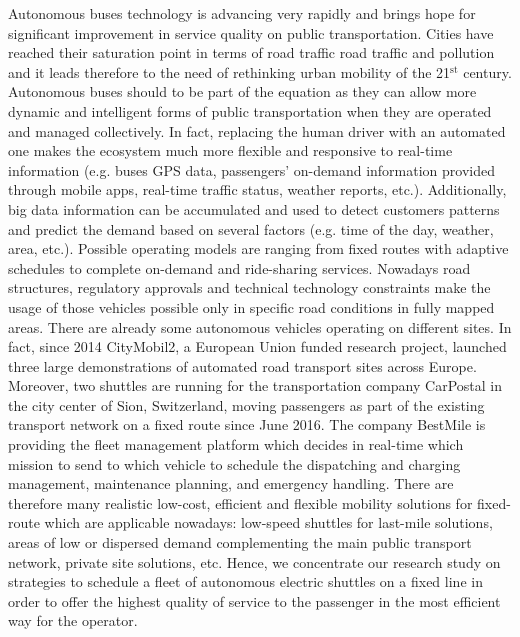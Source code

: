 \documentclass[12pt,a4paper]{article}
\begin{document}
Autonomous buses technology is advancing very rapidly and brings hope for significant improvement in service quality on public transportation. Cities have reached their saturation point in terms of road traffic road traffic and pollution and it leads therefore to the need of rethinking urban mobility of the 21$^{\text{st}}$ century. Autonomous buses should to be part of the equation as they can allow more dynamic and intelligent forms of public transportation when they are operated and managed collectively. In fact, replacing the human driver with an automated one makes the ecosystem much more flexible and responsive to real-time information (e.g. buses GPS data, passengers' on-demand information provided through mobile apps, real-time traffic status, weather reports, etc.). Additionally, big data information can be accumulated and used to detect customers patterns and predict the demand based on several factors (e.g. time of the day, weather, area, etc.). Possible operating models are ranging from  fixed routes with adaptive schedules to complete on-demand and ride-sharing services. Nowadays road structures, regulatory approvals and technical technology constraints make the usage of those vehicles possible only in specific road conditions in fully mapped areas. There are already some autonomous vehicles operating on different sites. In fact, since 2014 CityMobil2, a European Union funded research project, launched three large demonstrations of automated road transport sites across Europe. Moreover, two shuttles are running for the transportation company CarPostal in the city center of Sion, Switzerland, moving passengers as part of the existing transport network on a fixed route since June 2016. The company BestMile is providing the fleet management platform which decides in real-time which mission to send to which vehicle to schedule the dispatching and charging management, maintenance planning, and emergency handling. There are therefore many realistic low-cost, efficient and flexible mobility solutions for fixed-route which are applicable nowadays: low-speed shuttles for last-mile solutions, areas of low or dispersed demand complementing the main public transport network, private site solutions, etc. Hence, we concentrate our research study on strategies to schedule a fleet of autonomous electric shuttles on a fixed line in order to offer the highest quality of service to the passenger in the most efficient way for the operator.
\end{document}
